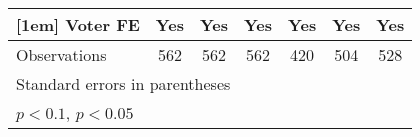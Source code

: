 \begin{table}[htbp]
\begin{tabular}{l*{6}{c}}
[1em]
Voter FE            &         Yes       &         Yes       &         Yes       &         Yes       &         Yes       &         Yes       \\
\hline
Observations        &         562       &         562       &         562       &         420       &         504       &         528       \\
\hline\hline
\multicolumn{7}{l}{\footnotesize Standard errors in parentheses}\\
\multicolumn{7}{l}{\footnotesize \sym{+} \(p<0.1\), \sym{*} \(p<0.05\)}\\
\end{tabular}
\end{table}

